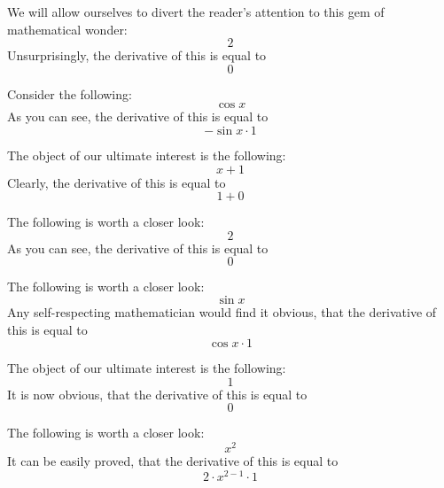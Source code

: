 \documentclass{article}
\begin{document}
We will allow ourselves to divert the reader's attention to this gem of mathematical wonder:
\begin{equation}
2 
\end{equation}
Unsurprisingly, the derivative of this is equal to
\begin{equation}
0 
\end{equation}

Consider the following:
\begin{equation}
\cos x 
\end{equation}
As you can see, the derivative of this is equal to
\begin{equation}
-\sin x \cdot 1 
\end{equation}

The object of our ultimate interest is the following:
\begin{equation}
x + 1 
\end{equation}
Clearly, the derivative of this is equal to
\begin{equation}
1 + 0 
\end{equation}

The following is worth a closer look:
\begin{equation}
2 
\end{equation}
As you can see, the derivative of this is equal to
\begin{equation}
0 
\end{equation}

The following is worth a closer look:
\begin{equation}
\sin x 
\end{equation}
Any self-respecting mathematician would find it obvious, that the derivative of this is equal to
\begin{equation}
\cos x \cdot 1 
\end{equation}

The object of our ultimate interest is the following:
\begin{equation}
1 
\end{equation}
It is now obvious, that the derivative of this is equal to
\begin{equation}
0 
\end{equation}

The following is worth a closer look:
\begin{equation}
x ^{2 } 
\end{equation}
It can be easily proved, that the derivative of this is equal to
\begin{equation}
2 \cdot x ^{2 - 1 } \cdot 1 
\end{equation}
\end{document}
